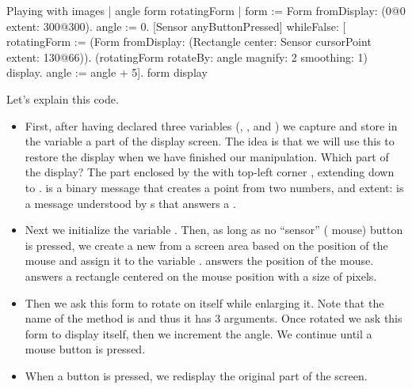 \documentclass[a4paper,10pt,twoside]{book}
\begin{document}
\begin{script}{Playing with images}\label{scr:rotate}
| angle form rotatingForm |
form := Form fromDisplay: (0@0 extent: 300@300).
angle := 0.
[Sensor anyButtonPressed] whileFalse: [
   rotatingForm := (Form fromDisplay:
               (Rectangle 
                    center: Sensor cursorPoint 
                    extent: 130@66)).
   (rotatingForm 
      rotateBy: angle	
      magnify: 2 
      smoothing: 1) display.
   angle := angle + 5].
form display
\end{script}

Let's explain this code.
\begin{itemize}
\item First, after having declared three variables (, , and ) we capture and store in the variable  a part of the display screen.
The idea is that we will use this to restore the display when we have finished our manipulation. 
Which part of the display? 
The part enclosed by the  with top-left corner , extending down to .
 is a binary message that creates a point from two numbers, and extent: is a message understood by s that answers a .
\item Next we initialize the variable . Then, as long as no ``sensor'' (\ie{} mouse) button is pressed, we create a new  from a screen area based on the position of the
mouse and assign it to the variable .  answers the position of the mouse.  answers a rectangle centered on the mouse position with a size of  pixels.
\item Then we ask this form to rotate on itself while enlarging it. 
Note that the name of the method is 
and thus it has 3 arguments. Once rotated we ask this form to display itself, 
then we increment the angle. We continue until a mouse button is pressed.
\item When a button is pressed, we redisplay the original part of the screen.
\end{itemize}

\ifx\wholebook\relax\else
\end{document}
